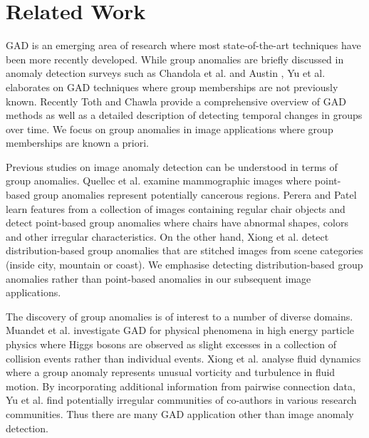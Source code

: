 \section{Related Work} \label{DGM:RelatedWork}
GAD is an emerging area  of research where most state-of-the-art techniques have been more recently developed.  While group anomalies are briefly discussed in anomaly detection surveys such as Chandola et al. \cite{Chandola} and Austin \cite{Hodge},  
  Yu et al. \cite{SurveySocialMedia} elaborates on GAD techniques where group memberships are not previously known.  
   {  Recently Toth and Chawla \cite{MySurvey} provide a comprehensive overview of GAD methods as well as a detailed  description of detecting temporal changes in groups over time. 
}
We focus on group anomalies in image applications where group memberships are known a priori. 

Previous studies on image anomaly detection %
can be understood in terms of group anomalies. 
Quellec et al.  \cite{mammo} examine mammographic images  where point-based group anomalies represent potentially cancerous regions. Perera and Patel \cite{chairs} learn features from a collection of images containing regular chair objects and detect point-based group anomalies where chairs have abnormal shapes, colors and other irregular characteristics. On the other hand, Xiong et al. \cite{FGM} detect distribution-based group anomalies that are stitched images from scene categories (inside city, mountain or coast). %
We emphasise detecting distribution-based group anomalies rather than point-based anomalies in our subsequent  image applications.

The discovery of group anomalies is of interest to a number of diverse domains.   
  Muandet et al.	\cite{OCSMM} investigate GAD for physical phenomena in high energy particle physics where Higgs bosons are observed as slight excesses in a collection of collision events rather than individual  events. Xiong et al. \cite{FGM} analyse fluid dynamics  where a group anomaly represents unusual vorticity and turbulence in  fluid motion.  %
   By incorporating additional information from pairwise connection data, Yu et al. \cite{GLAD} find potentially irregular communities of co-authors in various research communities.
Thus there are many GAD application other than image anomaly detection.
 

